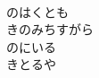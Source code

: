 \documentclass[10pt,b5j]{tarticle} %
\begin{document}
\begin{enumerate}
\begin{minipage}[c]{\blocksize}
        \vspace{\linespace}
        \item~\\
        のはくとも\\
        きのみちすがら\\
        のにいる\\
        きとるや
    
    \end{minipage}
\end{enumerate} %
\end{document}
